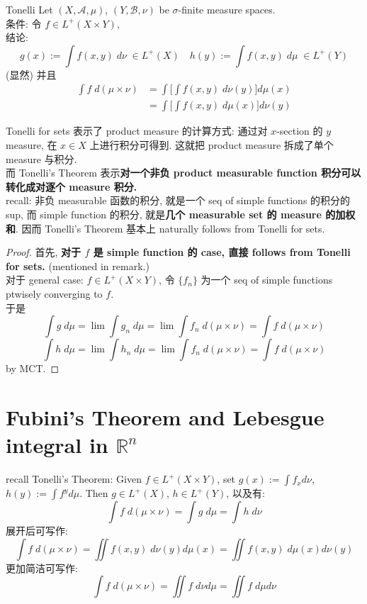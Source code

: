 \documentclass[lang=cn,11pt]{elegantbook}
\begin{document}
\begin{theorem}{Tonelli}
 Let $(X,\mathcal{A}, \mu)$, $(Y, \mathcal{B}, \nu)$ be $\sigma$-finite measure spaces.\\
条件: 令 $f \in L^+ (X \times Y)$,\\
结论:$$g(x) := \int f(x,y) \; d\nu\; \in L^+(X)\quad h(y) := \int f(x,y) \; d\mu \; \in L^+(Y) $$ (显然) 并且
\begin{align}
    \int f \; d(\mu\times \nu) &= \int \Big[   \int f(x,y) \; d\nu(y)  \Big] d\mu(x)\\
    &=  \int \Big[   \int f(x,y) \; d\mu(x)  \Big] d\nu(y)
\end{align}
\end{theorem}\begin{remark}
    Tonelli for sets 表示了 product measure 的计算方式: 通过对 $x$-section 的 $y$ measure, 在 $x\in X$ 上进行积分可得到. 这就把 product measure 拆成了单个 measure 与积分.\\
    而 Tonelli's Theorem 表示\textbf{对一个非负 product measurable function 积分可以转化成对逐个 measure 积分.} \\
recall: 非负 measurable 函数的积分, 就是一个 seq of simple functions 的积分的 sup, 而 simple function 的积分, 就是\textbf{几个 measurable set 的 measure 的加权和}.
因而 Tonelli's Theorem 基本上 naturally follows from Tonelli for sets.
\end{remark}
\begin{proof}
首先,\textbf{ 对于 $f$ 是 simple function 的 case, 直接 follows from Tonelli for sets.} (mentioned in remark.)\\
对于 general case: $f \in L^+(X\times Y)$, 令 $\{f_n\}$ 为一个 seq of simple functions ptwisely converging to $f$.\\
于是 \[
\int g \; d\mu = \lim \int g_n \; d\mu  = \lim \int f_n \;  d(\mu\times \nu) = \int f \; d(\mu\times \nu)
\]
\[
\int h \; d\mu = \lim \int h_n \; d\mu  = \lim \int f_n \;  d(\mu\times \nu) = \int f \; d(\mu\times \nu)
\]
by MCT.
\end{proof}


\chapter{Fubini's Theorem and Lebesgue integral in $\mathbb{R}^n$}
recall Tonelli's Theorem: Given $f \in L^+(X \times Y)$, set $g(x) := \int f_x d\nu $, $h(y) := \int f^y d \mu$. 
Then $g \in L^+(X)$, $h \in L^+(Y)$, 以及有: \[
\int f \; d(\mu \times \nu) = \int g \; d \mu = \int h \; d\nu
\]
展开后可写作: \[
\int f \; d(\mu \times \nu)  = \iint  f(x,y) \; d\nu(y) d\mu(x) = \iint f(x,y) \; d\mu(x) d\nu(y)
\]更加简洁可写作: \[
\int f \; d(\mu \times \nu) = \iint f \; d\nu d\mu  = \iint f \; d\mu d\nu
\]
\end{document}
